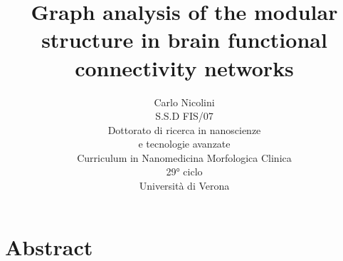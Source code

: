 \documentclass[11pt,%
              a4paper,%
              headinclude,footinclude,%
]{scrreprt} %
\title{Graph analysis of the modular structure in brain functional connectivity networks}
\author{Carlo Nicolini\\ S.S.D FIS/07\\Dottorato di ricerca in nanoscienze\\e tecnologie avanzate\\Curriculum in Nanomedicina Morfologica Clinica\\29° ciclo\\Università di Verona}
\date{}
\begin{document}
%
\maketitle

\chapter*{Abstract}

\end{document}
